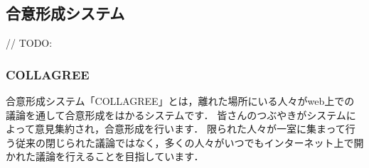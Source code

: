 \subsection{合意形成システム}
// TODO:

\subsubsection{COLLAGREE}
合意形成システム「COLLAGREE」とは，離れた場所にいる人々がweb上での議論を通して合意形成をはかるシステムです．
皆さんのつぶやきがシステムによって意見集約され，合意形成を行います．
限られた人々が一室に集まって行う従来の閉じられた議論ではなく，多くの人々がいつでもインターネット上で開かれた議論を行えることを目指しています．
